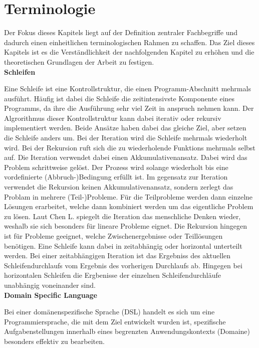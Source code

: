 \documentclass{article}
\begin{document}
    \section{Terminologie}
    Der Fokus dieses Kapitels liegt auf der Definition zentraler Fachbegriffe und dadurch einen einheitlichen terminologischen Rahmen zu schaffen. 
    Das Ziel dieses Kapitels ist es die Verständlichkeit der nachfolgenden Kapitel zu erhöhen und die theoretischen Grundlagen der Arbeit zu festigen.\\
    \textbf{Schleifen} \par
    Eine Schleife ist eine Kontrollstruktur, die einen Programm-Abschnitt mehrmals ausführt. \cite{22}
    Häufig ist dabei die Schleife die zeitintensivste Komponente eines Programms, da ihre die Ausführung sehr viel Zeit in anspruch nehmen kann. \cite{1}
    Der Algrorithmus dieser Kontrollstruktur kann dabei iterativ oder rekursiv implementiert werden. Beide Ansätze haben dabei das gleiche Ziel, aber setzen die Schleife anders um. Bei der Iteration wird die Schleife mehrmals wiederholt wird. Bei der Rekursion ruft sich die zu wiederholende Funktions mehrmals selbst auf. \cite{3}
    Die Iteration verwendet dabei einen Akkumulativenansatz. Dabei wird das Problem schrittweise gelöst. Der Prozess wird solange wiederholt bis eine vordefinierte (Abbruch-)Bedingung erfüllt ist. \cite{3}
    Im gegensatz zur Iteration verwendet die Rekursion keinen Akkumulativenansatz, sondern zerlegt das Problam in mehrere (Teil-)Probleme. Für die Teilprobleme werden dann einzelne Lösungen erarbeitet, welche dann kombiniert werden um das eigentliche Problem zu lösen. \cite{3}
    Laut Chen L. spiegelt die Iteration das menschliche Denken wieder, weshalb sie sich besonders für lineare Probleme eignet. 
    Die Rekursion hingegen ist für Probleme geeignet, welche Zwischenergebnisse oder Teillösungen benötigen. \cite{3}
    Eine Schleife kann dabei in zeitabhängig oder horizontal unterteilt werden. Bei einer zeitabhängigen Iteration ist das Ergebniss des aktuellen Schleifendurchlaufs vom Ergebnis des vorherigen Durchlaufs ab. Hingegen bei horizontalen Schleifen die Ergbenisse der einzelnen Schleifendurchläufe unabhängig voneinander sind. \cite{5} \\
    \textbf{Domain Specific Language} \par
    Bei einer domänenspezifische Sprache (DSL) handelt es sich um eine Programmiersprache, die mit dem Ziel entwickelt wurden ist, spezifische Aufgabenstellungen innerhalb eines begrenzten Anwendungskontexts (Domaine) besonders effektiv zu bearbeiten. \cite{18}
\end{document}
